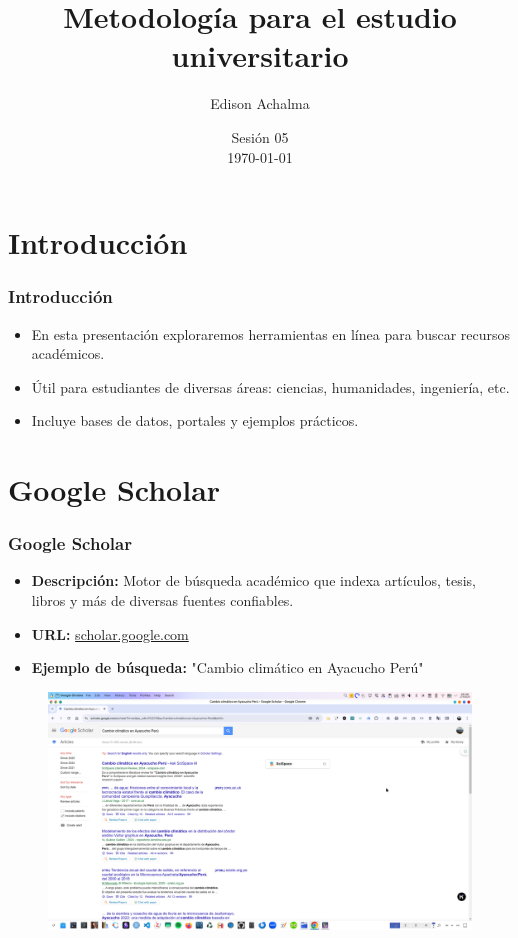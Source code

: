 \documentclass[
11pt, %
]{beamer}
\title[Metodología de Investigación]{Metodología para el estudio universitario} %
\author[Edison Achalma]{Edison Achalma} %
\institute[CAU - UNSCH]{Corporación Académica Universitaria CAU - UNSCH \\ \smallskip \textit{achalmed.18@gmail.com}} %
\date[\today]{Sesión 05 \\ \today} %
\begin{document}
\begin{frame}
	\titlepage
\end{frame}



\section{Introducción}
\begin{frame}
	\frametitle{Introducción}
	\begin{itemize}
		\item En esta presentación exploraremos herramientas en línea para buscar recursos académicos.
		\item Útil para estudiantes de diversas áreas: ciencias, humanidades, ingeniería, etc.
		\item Incluye bases de datos, portales y ejemplos prácticos.
	\end{itemize}
\end{frame}

\section{Google Scholar}
\begin{frame}
	\frametitle{Google Scholar}
	\begin{itemize}
		\item \textbf{Descripción:} Motor de búsqueda académico que indexa artículos, tesis, libros y más de diversas fuentes confiables.
		\item \textbf{URL:} \href{https://scholar.google.com}{scholar.google.com}
		\item \textbf{Ejemplo de búsqueda:} "Cambio climático en Ayacucho Perú"
	\end{itemize}
	\begin{figure}
		\centering
		\includegraphics[width=0.9\linewidth]{images/google_scholar.png}
		\label{fig:screenshot010}
	\end{figure}
\end{frame}
\end{document}
